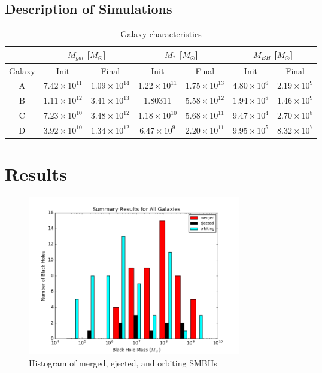 \documentclass[english, apj]{emulateapj}
\begin{document}
\subsection{Description of Simulations}
\begin{table}
\centering
\caption{Galaxy characteristics}
\begin{tabular}{c| c c| c c| c c}
 & \multicolumn{2}{c}{$M_{gal}$ [$M_{\odot}$]} & 
\multicolumn{2}{c}{$M_{*}$ [$M_{\odot}$]} & 
\multicolumn{2}{c}{$M_{BH}$ [$M_{\odot}$]} \\
\hline
Galaxy & Init & Final & Init & Final & Init & Final \\
 \hline
A & $7.42\times10^{11}$ & $1.09\times10^{14}$  & $1.22\times10^{11}$ & $1.75\times10^{13}$ & $4.80\times10^{6}$ & $2.19\times10^{9}$\\
B & $1.11\times10^{12}$ & $3.41\times10^{13}$ & $1.80\mathrm{3}{11}$ & $5.58\times10^{12}$ & $1.94\times10^{8}$ & $1.46\times10^{9}$\\
C & $7.23\times10^{10}$ & $3.48\times10^{12}$ & $1.18\times10^{10}$ & $5.68\times10^{11}$ & $9.47\times10^{4}$ & $2.70\times10^{8}$\\
D & $3.92\times10^{10}$ & $1.34\times10^{12}$ & $6.47\times10^{9}$ & $2.20\times10^{11}$ & $9.95\times10^{5}$ & $8.32\times10^{7}$\\
\end{tabular}
\end{table}





\section{Results}\label{sec:results}
\begin{figure}[H]
\begin{center}
\includegraphics[width=0.45\textwidth]{plots/Summary_Results_All_Galaxies.png}
\caption{Histogram of merged, ejected, and orbiting SMBHs}
\label{fig:meosmbh}
\end{center}
\end{figure}
\end{document}
